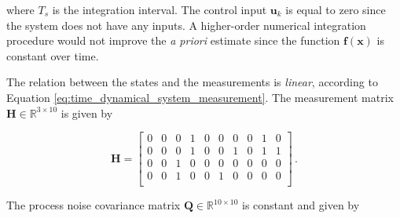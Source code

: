\noindent
where $T_s$ is the integration interval. The control input $\mathbf{u}_k$ is equal to zero since the system does not have any inputs. A higher-order numerical integration procedure would not improve the \emph{a priori} estimate since the function $\mathbf{f}(\mathbf{x})$ is constant over time.

The relation between the states and the measurements is \emph{linear}, according to Equation \ref{eq:time_dynamical_system_measurement}. The measurement matrix $\mathbf{H} \in \mathbb{R}^{3 \times 10}$ is given by 

\begin{equation}
\mathbf{H} = \begin{bmatrix}
  0 & 0 & 0 & 1 & 0 & 0 & 0 & 0 & 1 & 0\\
  0 & 0 & 0 & 1 & 0 & 0 & 1 & 0 & 1 & 1\\
  0 & 0 & 1 & 0 & 0 & 0 & 0 & 0 & 0 & 0 \\
  0 & 0 & 1 & 0 & 0 & 1 & 0 & 0 & 0 & 0\\
\end{bmatrix}\,.
\end{equation}

The process noise covariance matrix $\mathbf{Q} \in \mathbb{R}^{10 \times 10}$ is constant and given by


